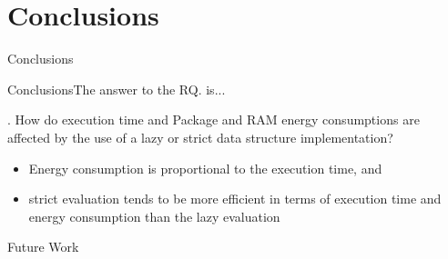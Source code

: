
\section{Conclusions}



    \begin{frame}[plain]{}

        \begin{center}

		\huge Conclusions

        \end{center}

    \end{frame}



    \begin{frame}{Conclusions}{The answer to the RQ. is...}

        \RQ{}. How do execution time and Package and RAM energy consumptions are affected by the use of a lazy or strict data structure implementation?

        \medskip

        \begin{itemize}

            \item Energy consumption is proportional to the execution time, and
	    \item strict evaluation tends to be more efficient in terms of execution time and energy consumption than the lazy evaluation


        \end{itemize}


    \end{frame}



    \begin{frame}[plain]{}

        \begin{center}

		\huge Future Work

        \end{center}

    \end{frame}


